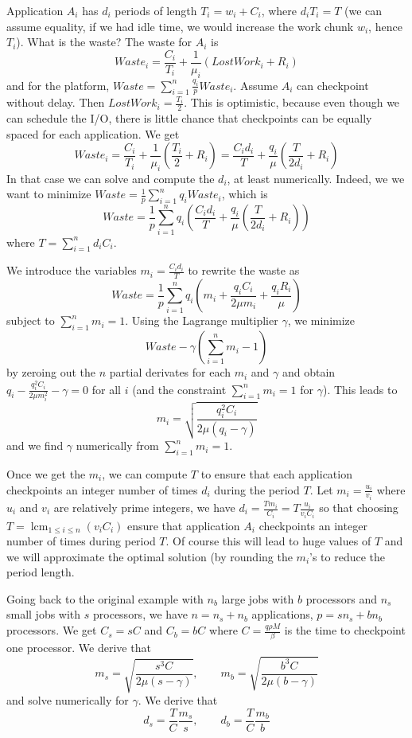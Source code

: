 \documentclass{article}
\DeclareMathOperator{\lcm}{lcm}
\begin{document}
Application $A_{i}$ has $d_{i}$ periods of length $T_{i } = w_{i}+C_{i}$, where 
$d_{i} T_{i} =T$
(we can assume equality, if we had idle time, we would increase the work chunk $w_{i}$, hence $T_{i}$).
What is the waste? The waste for $A_{i}$ is 
$$Waste_{i} = \frac{C_{i}}{T_{i}} + \frac{1}{\mu_{i}} (LostWork_{i} + R_{i})$$
and for the platform, $Waste = \sum_{i=1}^{n} \frac{q_{i}}{p} Waste_{i}$.
Assume $A_{i}$ can checkpoint without delay. Then $LostWork_{i} = \frac{T_{i}}{2}$.
This is  optimistic, because even though we can schedule the I/O, there is little chance that checkpoints can be equally spaced for each application.
We get
$$Waste_{i} = \frac{C_{i}}{T_{i}} + \frac{1}{\mu_{i}} (\frac{T_{i}}{2} + R_{i})
= \frac{C_{i} d_{i}}{T}+ \frac{q_{i}}{\mu} (\frac{T}{2d_{i}} + R_{i})$$
In that case we can solve and compute the $d_{i}$, at least numerically. 
Indeed, we we want to minimize 
$Waste = \frac{1}{p} \sum_{i=1}^{n} q_{i} Waste_{i}$, 
which is 
$$Waste = \frac{1}{p} \sum_{i=1}^{n} q_{i} (\frac{C_{i} d_{i}}{T}+ \frac{q_{i}}{\mu} (\frac{T}{2d_{i}} + R_{i}))$$
where $T  = \sum_{i=1}^{n} d_{i} C_{i}$.

We introduce the variables $m_{i} = \frac{C_{i} d_{i}}{T}$ to rewrite the waste as
$$Waste = \frac{1}{p} \sum_{i=1}^{n} q_{i} (m_{i}+ \frac{q_{i}C_{i}}{2 \mu m_{i}} +\frac{q_{i} R_{i}}{\mu})$$
subject to $\sum_{i=1}^{n} m_{i} = 1$.
Using the Lagrange multiplier $\gamma$, we minimize
$$Waste - \gamma (\sum_{i=1}^{n} m_{i} - 1)$$
by zeroing out the $n$ partial derivates for each $m_{i}$ and $\gamma$ and obtain
$q_{i} - \frac{q_{i}^{2} C_{i}}{2 \mu m_{i}^{2}} - \gamma = 0$ for all $i$ (and the constraint
$\sum_{i=1}^{n} m_{i} = 1$ for $\gamma$). This leads to 
$$m_{i} = \sqrt{\frac{q_{i}^{2} C_{i}}{2 \mu (q_{i} - \gamma)}}$$
and we find $\gamma$ numerically from $\sum_{i=1}^{n} m_{i} = 1$.

Once we get the $m_{i}$, we can compute $T$ to ensure that each application checkpoints an integer number of times $d_{i}$ during the period $T$. Let $m_{i} = \frac{u_{i}}{v_{i}}$
where $u_{i}$ and $v_{i}$ are relatively prime integers, we have 
$d_{i} = \frac{T m_{i}}{C_{i}} = T \frac{u_{i}}{v_{i} C_{i}}$
so that choosing $T = \lcm_{1 \leq i \leq n}(v_{i} C_{i})$ ensure that application $A_{i}$ checkpoints an integer number of times during period $T$. Of course this will lead to huge values of $T$
and we will approximate the optimal solution (by rounding the $m_{i}$'s to 
reduce the period length.

Going back to the original example with $n_{b}$ large jobs with $b$ processors
and $n_{s}$ small jobs with $s$ processors,
we have $n = n_{s} + n_{b}$ applications, $p =  s n_{s} + b n_{b}$ processors. We get
$C_{s} = s C$ and $C_{b} = b C$ where $C = \frac{q\rho M}{\beta}$ is the time to checkpoint one processor. We derive that 
$$m_{s} = \sqrt{\frac{s^{3} C}{2 \mu (s - \gamma)}}, \qquad m_{b} = \sqrt{\frac{b^{3} C}{2 \mu (b - \gamma)}}$$
and solve numerically for $\gamma$. We derive that
$$d_{s} = \frac{T}{C} \frac{m_{s}}{s}, \qquad d_{b} = \frac{T}{C} \frac{m_{b}}{b}$$
\end{document}
